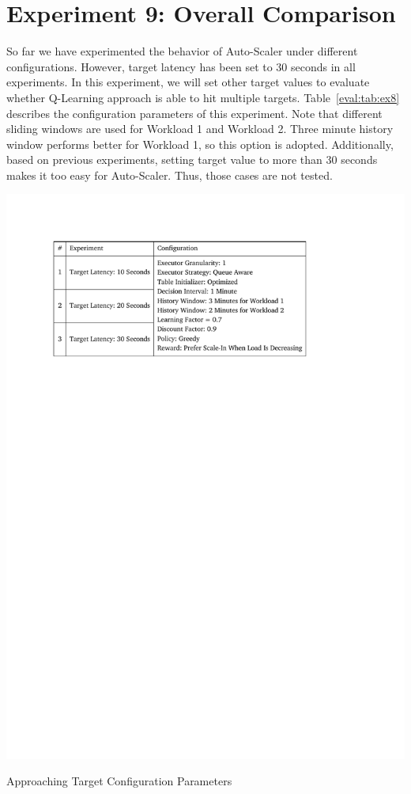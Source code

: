 \section{Experiment 9: Overall Comparison}
So far we have experimented the behavior of Auto-Scaler under different configurations. However, target latency has been set to 30 seconds in all experiments. In this experiment, we will set other target values to evaluate whether Q-Learning approach is able to hit multiple targets. Table~\ref{eval:tab:ex8} describes the configuration parameters of this experiment. Note that different sliding windows are used for Workload 1 and Workload 2. Three minute history window performs better for Workload 1, so this option is adopted. Additionally, based on previous experiments, setting target value to more than 30 seconds makes it too easy for Auto-Scaler. Thus, those cases are not tested. 
\begin{table}[h]
    \includegraphics[clip,trim=2.4cm 21.18cm 5.1cm 2.5cm]{tables/ex8.pdf}
    \centering
    \caption{Approaching Target Configuration Parameters}
    \label{eval:tab:ex9}
\end{table}

